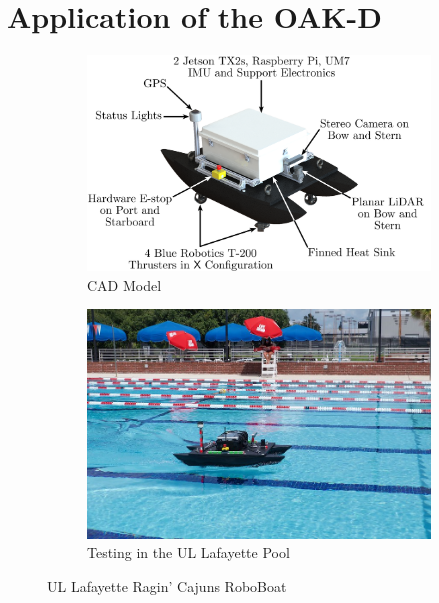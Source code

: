 \documentclass[12 pt]{article}
\begin{document}
\section{Application of the OAK-D}
\label{sec:}
\vspace{-0.2in}
%
\begin{figure}[tb]
\centering
    \begin{subfigure}{0.48\columnwidth}
    \centering
    \includegraphics[width=\columnwidth]{figures/Catamaran_Final_Render_3.pdf}
	\caption{CAD Model}
    \label{fig:roboboat_CAD}
    \end{subfigure}
%
\hspace{0.02\columnwidth} %
%
    \begin{subfigure}{0.48\columnwidth}
    \centering
    \includegraphics[width=\columnwidth]{figures/PoolTesting.jpg}  
    \caption{Testing in the UL Lafayette Pool}
    \label{fig:RoboBoat_pool}
    \end{subfigure}
\caption{UL Lafayette Ragin' Cajuns RoboBoat} %
\label{fig:RoboBoat}	%
\end{figure}
\end{document}
